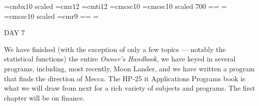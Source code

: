
\def\folio{\ifnum\pageno>0 \number\pageno \else
   \ifnum\pageno<0 \romannumeral-\pageno \else\fi\fi}

\font\largebf=cmbx10  scaled 
\font\largerm=cmr12
\font\largeit=cmti12
\font\tensc=cmcsc10
\font\sevensc=cmcsc10 scaled 700
\newfam\scfam \def\sc{\fam\scfam\tensc}
\textfont\scfam=\tensc \scriptfont\scfam=\sevensc
\scriptscriptfont\scfam=\sevensc
\font\largesc=cmcsc10 scaled 
\font\ninerm=cmr9
\newfam\srfam \def\sr{\fam\srfam\ninerm}
\textfont\srfam=\ninerm \scriptfont\srfam=\sevenrm
\scriptscriptfont\srfam=\fiverm




\null\vskip36pt

\centerline{\largerm DAY 7}
\nobreak\bigskip

\centerline{\largeit }
\nobreak\bigskip


\nobreak\bigskip

\noindent We have finished (with the exception of only a few topics --- notably the statistical functions) the entire {\it Owner's Handbook}, we have keyed in several programs, including, most recently, Moon Lander, and we have written a program that finds the direction of Mecca. The HP-25 {it Applications Programs} book is what we will draw from next for a rich variety of subjects and programs. The first chapter will be on finance.

\bigskip

\nobreak\bigskip

\bye
